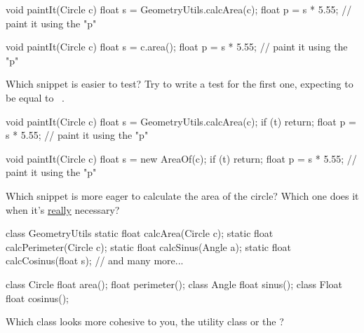 \documentclass{article}
\begin{document}

\begin{pptWide}{2}
{\small\begin{ffcode}
void paintIt(Circle c) {
  float s = GeometryUtils.calcArea(c);
  float p = s * 5.55;
  // paint it using the "p"
}
\end{ffcode}
}
\par\columnbreak\par
{\small\begin{ffcode}
void paintIt(Circle c) {
  float s = c.area();
  float p = s * 5.55;
  // paint it using the "p"
}
\end{ffcode}
}
\end{pptWide}
\par
Which snippet is easier to test? Try to write a test for the first one,
expecting  to be equal to ~\citep{bugayenko2014blog0505}.
\plush{}

\begin{pptWide}{2}
{\small\begin{ffcode}
void paintIt(Circle c) {
  float s = GeometryUtils.calcArea(c);
  if (t) { return; }
  float p = s * 5.55;
  // paint it using the "p"
}
\end{ffcode}
}
\par\columnbreak\par
{\small\begin{ffcode}
void paintIt(Circle c) {
  float s = new AreaOf(c);
  if (t) { return; }
  float p = s * 5.55;
  // paint it using the "p"
}
\end{ffcode}
}
\end{pptWide}
\par
Which snippet is more eager to calculate the area of the circle?
Which one does it when it's \ul{really} necessary?~\citep{bugayenko2015blog0226}
\plush{}

\begin{pptWide}{2}
{\small\begin{ffcode}
class GeometryUtils {
  static float calcArea(Circle c);
  static float calcPerimeter(Circle c);
  static float calcSinus(Angle a);
  static float calcCosinus(float s);
  // and many more...
}
\end{ffcode}
}
\par\columnbreak\par
{\small\begin{ffcode}
class Circle {
  float area();
  float perimeter();
}
class Angle {
  float sinus();
}
class Float {
  float cosinus();
}
\end{ffcode}
}
\end{pptWide}
\par
Which class looks more cohesive to you, the utility class  or the ?
\plush{}
\end{document}
